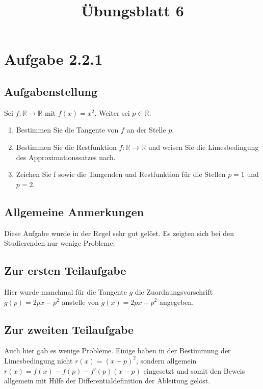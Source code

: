 \documentclass[a4paper]{article}
\title{Übungsblatt 6}
\date{}
\author{}
\newcommand*{\R}{\mathbb R}
\begin{document}
\maketitle

\section{Aufgabe 2.2.1}

\subsection{Aufgabenstellung}

Sei $f:\R\to\R$ mit $f(x)=x^2$. Weiter sei $p\in\R$.

\begin{enumerate}
  \item Bestimmen Sie die Tangente von $f$ an der Stelle $p$.
  \item Bestimmen Sie die Restfunktion $f:\R\to\R$ und weisen Sie die Limesbedingung des Approximationssatzes nach.
  \item Zeichen Sie f sowie die Tangenden und Restfunktion für die Stellen $p=1$ und $p=2$.
\end{enumerate}

\subsection{Allgemeine Anmerkungen}

Diese Aufgabe wurde in der Regel sehr gut gelöst. Es zeigten sich bei den Studierenden nur wenige Probleme.

\subsection{Zur ersten Teilaufgabe}

Hier wurde manchmal für die Tangente $g$ die Zuordnungsvorschrift $g(p)=2px-p^2$ anstelle von $g(x)=2px-p^2$ angegeben.

\subsection{Zur zweiten Teilaufgabe}

Auch hier gab es wenige Probleme. Einige haben in der Bestimmung der Limesbedingung nicht $r(x)=(x-p)^2$, sondern allgemein $r(x)=f(x)-f(p)-f'(p)(x-p)$ eingesetzt und somit den Beweis allgemein mit Hilfe der Differentialdefinition der Ableitung gelöst.
\end{document}
